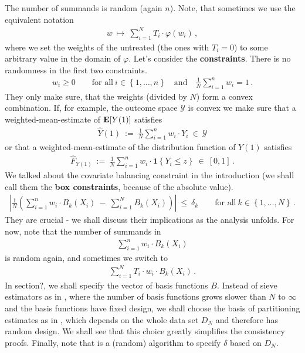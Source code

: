 The number of summands is random (again $n$).
Note, that sometimes we use the equivalent notation
\begin{gather*}
  w
  \ 
  \mapsto
  \ 
    \sum_{i = 1}^{N} 
    T_i
    \cdot
    \varphi(w_i)
    \,,
\end{gather*}
where we set the weights of the untreated (the ones with $T_i=0$) to some arbitrary value in the domain of $\varphi$.
Let's consider the \textbf{constraints}. There is no randomness in the first two constraints.
\begin{gather*}
    w_i 
    \ge
    0
    \qquad
    \text{for all}\ 
    i \in \left\{ 1, \ldots, n \right\}
    \quad
    \text{and}
    \quad
    \frac{1}{N}
    \sum_{i=1}^{n} 
    w_i
    =1
    \,.
\end{gather*}
They only make sure, that the weights (divided by $N$) form a convex combination.
If, for example, the outcome space $\mathcal{Y}$ is convex we make sure that a weighted-mean-estimate of $\mathbf{E}[Y(1)]$ satisfies
\begin{gather*}
  \widehat{Y}(1) 
  \ 
  :=
  \ 
  \frac{1}{N}
  \sum_{i=1}^{n} 
  w_i\cdot Y_i
  \ 
  \in
  \ 
  \mathcal{Y}
\end{gather*}
or that a weighted-mean-estimate of the distribution function of $Y(1)$ satisfies
\begin{gather*}
  \widehat{F}_{Y(1)} 
  \ 
  :=
  \ 
  \frac{1}{N}
  \sum_{i=1}^{n} 
  w_i\cdot \mathbf{1}\left\{ Y_i\le z \right\}
  \ 
  \in
  \ 
  [0,1]
  \,.
\end{gather*}
We talked about the covariate balancing constraint
in the introduction
(we shall call them the \textbf{box constraints}, because of the absolute value).
\begin{gather*}
    \left| 
      \frac{1}{N} 
      \left( 
      \sum_{i = 1}^{n} 
      w_i
      \cdot
      B_k(X_i)
      \ 
      -
      \ 
      \sum_{i=1}^{N} 
      B_k(X_i)
      \right)
    \right|
    \ 
    \le 
    \ 
    \delta_k
    \qquad
    \text{for all}\ 
    k \in \left\{ 1, \ldots, N\right\}
    \,.
\end{gather*}
They are crucial - we shall discuss their implications as the analysis unfolds.
For now, note that the number of summands in
\begin{gather*}
      \sum_{i = 1}^{n} 
      w_i
      \cdot
      B_k(X_i)
\end{gather*}
is random again, and sometimes we switch to
\begin{gather*}
      \sum_{i = 1}^{N} 
      T_i
      \cdot
      w_i
      \cdot
      B_k(X_i)
      \,.
\end{gather*}
In section?, we shall specify the vector of basis functions $B$.
Instead of sieve estimators as in \cite{Wang2019}, where the number of basis functions grows slower than $N$ to $\infty$ 
and the basis functions have fixed design,
we shall choose the basis of partitioning estimates as in \cite[§4]{Gyorfi2002}, which depends on the whole data set $D_N$
and therefore has random design.
We shall see that this choice greatly simplifies the consistency proofs.
Finally, note that \cite[Algorithm~1 on page 11]{Wang2019}
is a (random) algorithm to specify $\delta$ based on $D_N$. 
